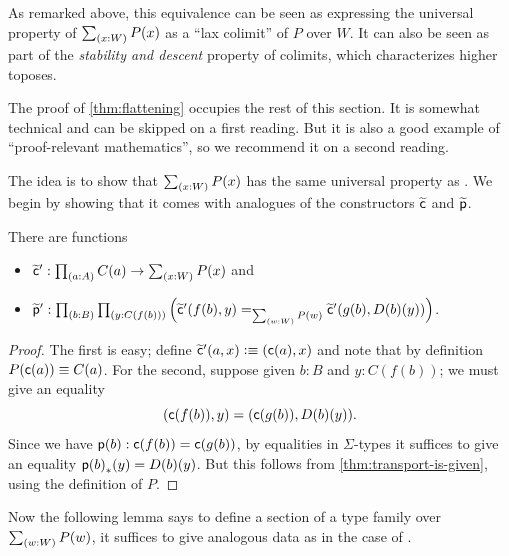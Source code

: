 %
As remarked above, this equivalence can be seen as expressing the universal property of $\sm{x:W} P(x)$ as a ``lax colimit'' of $P$ over $W$.
It can also be seen as part of the \emph{stability and descent} property of colimits, which characterizes higher toposes.%
%
%

The proof of \cref{thm:flattening} occupies the rest of this section.
It is somewhat technical and can be skipped on a first reading.
But it is also a good example of ``proof-relevant mathematics'',
%
so we recommend it on a second reading.

The idea is to show that $\sm{x:W} P(x)$ has the same universal property as \Wtil.
We begin by showing that it comes with analogues of the constructors $\widetilde{\mathsf{c}}$ and $\widetilde{\mathsf{p}}$.

\begin{lem}\label{thm:flattening-cp}
  There are functions
  \begin{itemize}
  \item $\cct':\prd{a:A} C(a) \to \sm{x:W} P(x)$ and
  \item $\ppt':\prd{b:B}{y:C(f(b))} \Big(\cct'(f(b),y)=_{\sm{w:W}P(w)}\cct'(g(b),D(b)(y))\Big)$.
  \end{itemize}
\end{lem}
\begin{proof}
  The first is easy; define $\widetilde{\mathsf{c}}'(a,x) \vcentcolon\equiv (\mathsf{c}(a),x)$ and note that by definition $P(\mathsf{c}(a))\equiv C(a)$.
  For the second, suppose given $b:B$ and $y:C(f(b))$; we must give an equality
  \[ (\mathsf{c}(f(b)),y) = (\mathsf{c}(g(b)),D(b)(y)). \]
  Since we have $\mathsf{p}(b):\mathsf{c}(f(b))=\mathsf{c}(g(b))$, by equalities in $\Sigma$-types it suffices to give an equality ${\mathsf{p}(b)}_{*}\mathopen{}\left({y}\right)\mathclose{} = D(b)(y)$.
  But this follows from \cref{thm:transport-is-given}, using the definition of $P$.
\end{proof}

Now the following lemma says to define a section of a type family over $\sm{w:W} P(w)$, it suffices to give analogous data as in the case of \Wtil.

